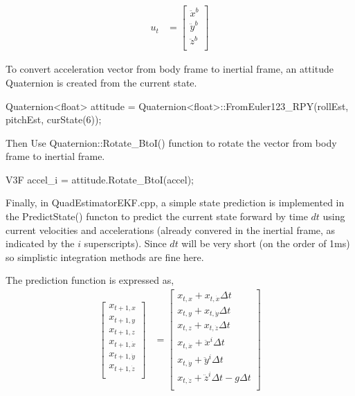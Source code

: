 \documentclass[letterpaper]{article}
\begin{document}
\begin{align*}
  u_t &= \left[ \begin{array}{c}
      \ddot{x}^b \\
      \ddot{y}^b \\
      \ddot{z}^b \\
      \end{array} \right]
\end{align*}

To convert acceleration vector from body frame to inertial frame, an attitude Quaternion is created from the current state. 

\begin{CPP}
Quaternion<float> attitude = Quaternion<float>::FromEuler123_RPY(rollEst, pitchEst, curState(6));
\end{CPP}

Then Use Quaternion::Rotate\_BtoI() function to rotate the vector from body frame to inertial frame.
\begin{CPP}
V3F accel_i = attitude.Rotate_BtoI(accel);
\end{CPP}

Finally, in QuadEstimatorEKF.cpp, a simple state prediction is implemented in the PredictState() functon to predict the current state forward by time $dt$ using current velocities and accelerations (already convered in the inertial frame, as indicated by the $i$ superscripts). Since $dt$ will be very short (on the order of 1ms) so simplistic integration methods are fine here.

The prediction function is expressed as,
\begin{align*}
  \left[  \begin{array}{c}
      x_{t+1,x} \\
      x_{t+1,y} \\
      x_{t+1,z} \\
      x_{t+1,\dot{x}} \\
      x_{t+1,\dot{y}} \\
      x_{t+1,\dot{z}} \\
    \end{array}\right] &=
  \left[  \begin{array}{l}
      x_{t,x} + x_{t,\dot{x}} \Delta t \\
      x_{t,y} + x_{t,\dot{y}} \Delta t \\
      x_{t,z} + x_{t,\dot{z}} \Delta t \\
      x_{t,\dot{x}} + \ddot{x}^i  \Delta t \\
      x_{t,\dot{y}} + \ddot{y}^i  \Delta t \\
      x_{t,\dot{z}} + \ddot{z}^i  \Delta t - g \Delta t \\
    \end{array}\right] 
\end{align*}
\end{document}
